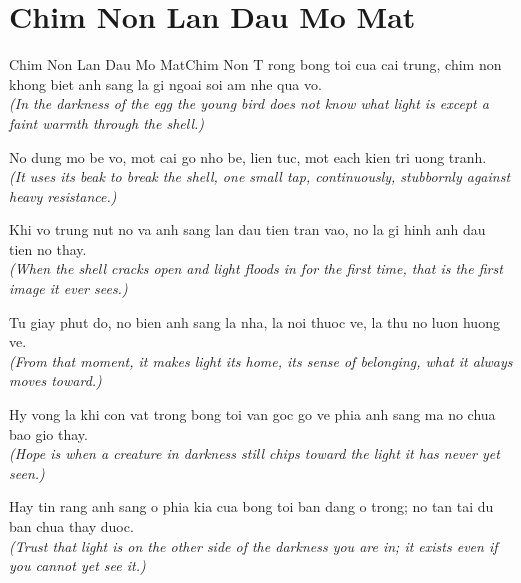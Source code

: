 \section{Chim Non Lan Dau Mo Mat}
\begin{truyen}{Chim Non Lan Dau Mo Mat}{Chim Non}
T rong bong toi cua cai trung, chim non khong biet anh sang la gi ngoai soi am nhe qua vo.\\
\textit{(In the darkness of the egg the young bird does not know what light is except a faint warmth through the shell.)}

No dung mo be vo, mot cai go nho be, lien tuc, mot each kien tri uong tranh.\\
\textit{(It uses its beak to break the shell, one small tap, continuously, stubbornly against heavy resistance.)}

Khi vo trung nut no va anh sang lan dau tien tran vao, no la gi hinh anh dau tien no thay.\\
\textit{(When the shell cracks open and light floods in for the first time, that is the first image it ever sees.)}

Tu giay phut do, no bien anh sang la nha, la noi thuoc ve, la thu no luon huong ve.\\
\textit{(From that moment, it makes light its home, its sense of belonging, what it always moves toward.)}

Hy vong la khi con vat trong bong toi van goc go ve phia anh sang ma no chua bao gio thay.\\
\textit{(Hope is when a creature in darkness still chips toward the light it has never yet seen.)}

\end{truyen}
\begin{baihoc}
  Hay tin rang anh sang o phia kia cua bong toi ban dang o trong; no tan tai du ban chua thay duoc.\\
  \textit{(Trust that light is on the other side of the darkness you are in; it exists even if you cannot yet see it.)}
\end{baihoc}

